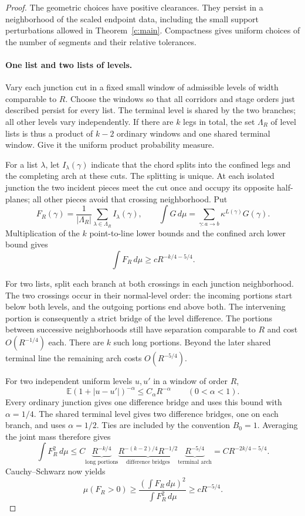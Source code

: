 \documentclass[11pt]{article}
\numberwithin{equation}{section}
\theoremstyle{definition}\newtheorem{definition}[theorem]{Definition}
\theoremstyle{remark}\newtheorem{remark}[theorem]{Remark}
\begin{document}
\begin{proof}
The geometric choices have positive clearances. They persist in a
neighborhood of the scaled endpoint data, including the small support
perturbations allowed in Theorem~\ref{c:main}. Compactness gives uniform
choices of the number of segments and their relative tolerances.

\paragraph{One list and two lists of levels.}
Vary each junction cut in a fixed small window of admissible levels of
width comparable to $R$. Choose the windows so that all corridors and
stage orders just described persist for every list. The terminal level
is shared by the two branches; all other levels vary independently.
If there are $k$ legs in total, the set $\Lambda_R$ of level lists is
thus a product of $k-2$ ordinary windows and one shared terminal window.
Give it the uniform product probability measure.

For a list $\lambda$, let $I_\lambda(\gamma)$ indicate that the chord
splits into the confined legs and the completing arch at these cuts.
The splitting is unique. At each isolated junction the two incident
pieces meet the cut once and occupy its opposite half-planes; all other
pieces avoid that crossing neighborhood. Put
\[
 F_R(\gamma)=\frac1{|\Lambda_R|}\sum_{\lambda\in\Lambda_R}I_\lambda(\gamma),
 \qquad
 \int G\,d\mu=\sum_{\gamma:a\to b}\kappa^{L(\gamma)}G(\gamma).
\]
Multiplication of the $k$ point-to-line lower bounds and the confined
arch lower bound gives
\[
 \int F_R\,d\mu\ge cR^{-k/4-5/4}.
\]

For two lists, split each branch at both crossings in each junction
neighborhood. The two crossings occur in their normal-level order:
the incoming portions start below both levels, and the outgoing
portions end above both. The intervening portion is consequently a
strict bridge of the level difference. The portions between successive
neighborhoods still have separation comparable to $R$ and cost
$O(R^{-1/4})$ each. There are $k$ such long portions. Beyond the later
shared terminal line the remaining arch costs $O(R^{-5/4})$.

For two independent uniform levels $u,u'$ in a window of order $R$,
\[
 \mathbb E(1+|u-u'|)^{-\alpha}\le C_\alpha R^{-\alpha}
 \qquad(0<\alpha<1).
\]
Every ordinary junction gives one difference bridge and uses this bound
with $\alpha=1/4$. The shared terminal level gives two difference
bridges, one on each branch, and uses $\alpha=1/2$. Ties are included
by the convention $B_0=1$. Averaging the joint mass therefore gives
\[
 \int F_R^2\,d\mu
 \le C\underbrace{R^{-k/4}}_{\text{long portions}}
       \underbrace{R^{-(k-2)/4}R^{-1/2}}_{\text{difference bridges}}
       \underbrace{R^{-5/4}}_{\text{terminal arch}}
 =CR^{-2k/4-5/4}.
\]
Cauchy--Schwarz now yields
\[
 \mu(F_R>0)\ge
 \frac{(\int F_R\,d\mu)^2}{\int F_R^2\,d\mu}
 \ge cR^{-5/4}.
\]


\end{proof}
\end{document}
